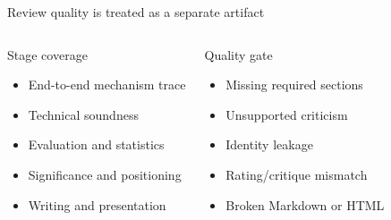 \documentclass[aspectratio=169,professionalfonts]{beamer}
\begin{document}
\begin{frame}{Review quality is treated as a separate artifact}
  \begin{columns}[T,onlytextwidth]
      \begin{block}{Stage coverage}
        \begin{itemize}
          \item End-to-end mechanism trace
          \item Technical soundness
          \item Evaluation and statistics
          \item Significance and positioning
          \item Writing and presentation
        \end{itemize}
      \end{block}
      \begin{block}{Quality gate}
        \begin{itemize}
          \item Missing required sections
          \item Unsupported criticism
          \item Identity leakage
          \item Rating/critique mismatch
          \item Broken Markdown or HTML
        \end{itemize}
      \end{block}
  \end{columns}

\end{frame}
\end{document}
